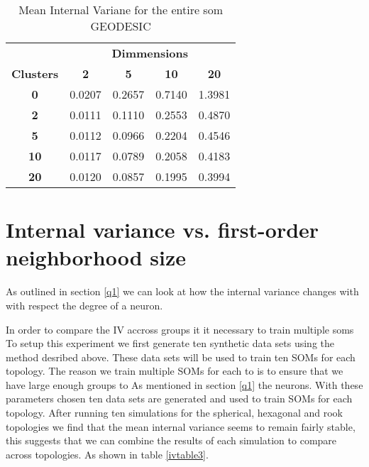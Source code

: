 \begin{table}
\caption{Mean Internal Variane for the entire som GEODESIC}
\label{ivtablegeodesic}
\begin{tabular}{|c||c|c|c|c|}
\hline
&\multicolumn{4}{c|}{\textbf{Dimmensions}}\\
\textbf{Clusters} & \multicolumn{1}{c}{\textbf{2}} &
\multicolumn{1}{c}{\textbf{5}} & \multicolumn{1}{c}{\textbf{10}} &
\multicolumn{1}{c|}{\textbf{20}}\\
\hline
\hline
\textbf{0} & 0.0207& 0.2657& 0.7140& 1.3981 \\
\hline
\textbf{2} & 0.0111& 0.1110& 0.2553& 0.4870 \\
\hline
\textbf{5} & 0.0112& 0.0966& 0.2204& 0.4546 \\
\hline
\textbf{10} & 0.0117& 0.0789& 0.2058& 0.4183 \\
\hline
\textbf{20} & 0.0120& 0.0857& 0.1995& 0.3994 \\
\hline
\end{tabular} \end{table}






\section{Internal variance vs. first-order neighborhood size}
As outlined in section \ref{q1} we can look at how the internal variance
changes with with respect the degree of a neuron.  

In order to compare the IV accross groups it it necessary to train multiple
soms 
To setup this experiment we
first generate ten synthetic data sets using the method desribed above.  These
data sets will be used to train ten SOMs for each topology.  The reason we
train multiple SOMs for each to is to ensure that we have large enough groups to 
As mentioned in section \ref{q1} the neurons.
With these parameters chosen ten data sets are generated and used to train
SOMs for each topology.  After running ten simulations for the spherical,
hexagonal and rook topologies we find that the mean internal variance seems to
remain fairly stable, this suggests that we can combine the results of each
simulation to compare across topologies. As shown in table \ref{ivtable3}.


